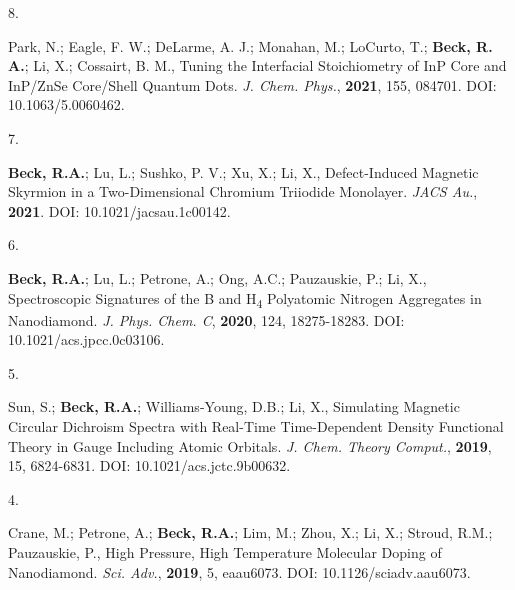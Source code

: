 \begin{cvpublications}


\cvpublication
{8.}
{\parbox[t]{0.95\textwidth}{\strut Park, N.; Eagle, F. W.; DeLarme, A. J.; Monahan, M.; LoCurto, T.; \textbf{Beck, R. A.}; Li, X.; Cossairt, B. M.,
Tuning the Interfacial Stoichiometry of InP Core and InP/ZnSe Core/Shell Quantum Dots.
\textit{J. Chem. Phys.}, \textbf{2021}, 155, 084701.
DOI: 10.1063/5.0060462.}}




\cvpublication
{7.}
{\parbox[t]{0.95\textwidth}{\strut \textbf{Beck, R.A.}; Lu, L.; Sushko, P. V.; Xu, X.; Li, X.,
Defect-Induced Magnetic Skyrmion in a Two-Dimensional Chromium Triiodide Monolayer.
\textit{JACS Au.}, \textbf{2021}. 
DOI: 10.1021/jacsau.1c00142.}}




\cvpublication
{6.}
{\parbox[t]{0.95\textwidth}{\strut \textbf{Beck, R.A.}; Lu, L.; Petrone, A.; Ong, A.C.; Pauzauskie, P.; Li, X., 
Spectroscopic Signatures of the B and H\textsubscript{4} Polyatomic Nitrogen Aggregates in Nanodiamond.
\textit{J. Phys. Chem. C}, \textbf{2020}, 124, 18275-18283.
DOI: 10.1021/acs.jpcc.0c03106.}}




\cvpublication
{5.}
{\parbox[t]{0.95\textwidth}{\strut Sun, S.; \textbf{Beck, R.A.}; Williams-Young, D.B.; Li, X.,
Simulating Magnetic Circular Dichroism Spectra with Real-Time Time-Dependent Density Functional Theory in Gauge Including Atomic Orbitals.
\textit{J. Chem. Theory Comput.}, \textbf{2019}, 15, 6824-6831.
DOI: 10.1021/acs.jctc.9b00632.}}




\cvpublication
{4.}
{\parbox[t]{0.95\textwidth}{\strut Crane, M.; Petrone, A.; \textbf{Beck, R.A.}; Lim, M.; Zhou, X.; Li, X.; Stroud, R.M.; Pauzauskie, P.,
High Pressure, High Temperature Molecular Doping of Nanodiamond.
\textit{Sci. Adv.}, \textbf{2019}, 5, eaau6073.
DOI: 10.1126/sciadv.aau6073.}}


\end{cvpublications}
